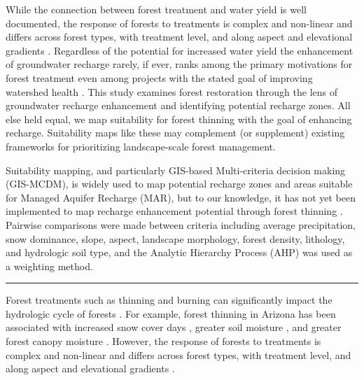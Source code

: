 \documentclass[
  number]{elsarticle}
\begin{document}
While the connection between forest treatment and water yield is well
documented, the response of forests to treatments is complex and
non-linear and differs across forest types, with treatment level, and
along aspect and elevational gradients
\citep{del_campo_global_2022, biederman_streamflow_2022, zou_streamflow_2010, hibbert1979, moore_physical_2005}.
Regardless of the potential for increased water yield the enhancement of
groundwater recharge rarely, if ever, ranks among the primary
motivations for forest treatment even among projects with the stated
goal of improving watershed health
\citep{stanturf2014, filoso2017, allen_ecological_2002, friederici2013, odonnell2016}.
This study examines forest restoration through the lens of groundwater
recharge enhancement and identifying potential recharge zones. All else
held equal, we map suitability for forest thinning with the goal of
enhancing recharge. Suitability maps like these may complement (or
supplement) existing frameworks for prioritizing landscape-scale forest
management.

Suitability mapping, and particularly GIS-based Multi-criteria decision
making (GIS-MCDM), is widely used to map potential recharge zones and
areas suitable for Managed Aquifer Recharge (MAR), but to our knowledge,
it has not yet been implemented to map recharge enhancement potential
through forest thinning \citep{fathi2021, rajashekar2023}. Pairwise
comparisons were made between criteria including average precipitation,
snow dominance, slope, aspect, landscape morphology, forest density,
lithology, and hydrologic soil type, and the Analytic Hierarchy Process
(AHP) was used as a weighting method.

\begin{center}\rule{0.5\linewidth}{0.5pt}\end{center}

Forest treatments such as thinning and burning can significantly impact
the hydrologic cycle of forests \citep{del_campo_global_2022}. For
example, forest thinning in Arizona has been associated with increased
snow cover days
\citep{sankey_multi-scale_2015, belmonte_uav-based_2021, donager_integrating_2021},
greater soil moisture \citep{belmonte_soil_2022, sankey_thinning_2022},
and greater forest canopy moisture \citep{sankey_regionalscale_2021}.
However, the response of forests to treatments is complex and non-linear
and differs across forest types, with treatment level, and along aspect
and elevational gradients
\citep{del_campo_global_2022, biederman_streamflow_2022, zou_streamflow_2010, hibbert1979, moore_physical_2005}.
\end{document}
